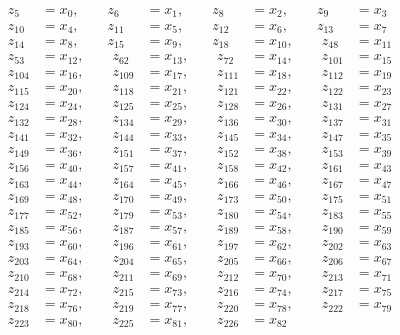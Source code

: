 \begin{align*}
z_{5}&=x_{0},\qquad z_{6}&=x_{1},\qquad z_{8}&=x_{2},\qquad z_{9}&=x_{3}\\
z_{10}&=x_{4},\qquad z_{11}&=x_{5},\qquad z_{12}&=x_{6},\qquad z_{13}&=x_{7}\\
z_{14}&=x_{8},\qquad z_{15}&=x_{9},\qquad z_{18}&=x_{10},\qquad z_{48}&=x_{11}\\
z_{53}&=x_{12},\qquad z_{62}&=x_{13},\qquad z_{72}&=x_{14},\qquad z_{101}&=x_{15}\\
z_{104}&=x_{16},\qquad z_{109}&=x_{17},\qquad z_{111}&=x_{18},\qquad z_{112}&=x_{19}\\
z_{115}&=x_{20},\qquad z_{118}&=x_{21},\qquad z_{121}&=x_{22},\qquad z_{122}&=x_{23}\\
z_{124}&=x_{24},\qquad z_{125}&=x_{25},\qquad z_{128}&=x_{26},\qquad z_{131}&=x_{27}\\
z_{132}&=x_{28},\qquad z_{134}&=x_{29},\qquad z_{136}&=x_{30},\qquad z_{137}&=x_{31}\\
z_{141}&=x_{32},\qquad z_{144}&=x_{33},\qquad z_{145}&=x_{34},\qquad z_{147}&=x_{35}\\
z_{149}&=x_{36},\qquad z_{151}&=x_{37},\qquad z_{152}&=x_{38},\qquad z_{153}&=x_{39}\\
z_{156}&=x_{40},\qquad z_{157}&=x_{41},\qquad z_{158}&=x_{42},\qquad z_{161}&=x_{43}\\
z_{163}&=x_{44},\qquad z_{164}&=x_{45},\qquad z_{166}&=x_{46},\qquad z_{167}&=x_{47}\\
z_{169}&=x_{48},\qquad z_{170}&=x_{49},\qquad z_{173}&=x_{50},\qquad z_{175}&=x_{51}\\
z_{177}&=x_{52},\qquad z_{179}&=x_{53},\qquad z_{180}&=x_{54},\qquad z_{183}&=x_{55}\\
z_{185}&=x_{56},\qquad z_{187}&=x_{57},\qquad z_{189}&=x_{58},\qquad z_{190}&=x_{59}\\
z_{193}&=x_{60},\qquad z_{196}&=x_{61},\qquad z_{197}&=x_{62},\qquad z_{202}&=x_{63}\\
z_{203}&=x_{64},\qquad z_{204}&=x_{65},\qquad z_{205}&=x_{66},\qquad z_{206}&=x_{67}\\
z_{210}&=x_{68},\qquad z_{211}&=x_{69},\qquad z_{212}&=x_{70},\qquad z_{213}&=x_{71}\\
z_{214}&=x_{72},\qquad z_{215}&=x_{73},\qquad z_{216}&=x_{74},\qquad z_{217}&=x_{75}\\
z_{218}&=x_{76},\qquad z_{219}&=x_{77},\qquad z_{220}&=x_{78},\qquad z_{222}&=x_{79}\\
z_{223}&=x_{80},\qquad z_{225}&=x_{81},\qquad z_{226}&=x_{82}
\end{align*}
